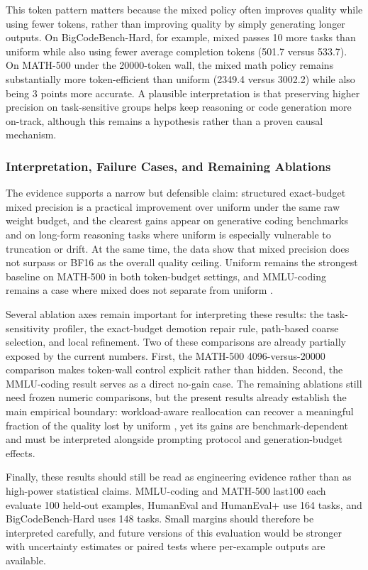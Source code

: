 This token pattern matters because the mixed policy often improves quality while using fewer tokens, rather than improving quality by simply generating longer outputs. On BigCodeBench-Hard, for example, mixed passes 10 more tasks than uniform \intfour{} while also using fewer average completion tokens (501.7 versus 533.7). On MATH-500 under the 20000-token wall, the mixed math policy remains substantially more token-efficient than uniform \intfour{} (2349.4 versus 3002.2) while also being 3 points more accurate. A plausible interpretation is that preserving higher precision on task-sensitive groups helps keep reasoning or code generation more on-track, although this remains a hypothesis rather than a proven causal mechanism.

\subsubsection{Interpretation, Failure Cases, and Remaining Ablations}

The evidence supports a narrow but defensible claim: structured exact-budget mixed precision is a practical improvement over uniform \intfour{} under the same raw weight budget, and the clearest gains appear on generative coding benchmarks and on long-form reasoning tasks where uniform \intfour{} is especially vulnerable to truncation or drift. At the same time, the data show that mixed precision does not surpass \inteight{} or BF16 as the overall quality ceiling. Uniform \inteight{} remains the strongest baseline on MATH-500 in both token-budget settings, and MMLU-coding remains a case where mixed does not separate from uniform \intfour{}.

Several ablation axes remain important for interpreting these results: the task-sensitivity profiler, the exact-budget demotion repair rule, path-based coarse selection, and local refinement. Two of these comparisons are already partially exposed by the current numbers. First, the MATH-500 4096-versus-20000 comparison makes token-wall control explicit rather than hidden. Second, the MMLU-coding result serves as a direct no-gain case. The remaining ablations still need frozen numeric comparisons, but the present results already establish the main empirical boundary: workload-aware reallocation can recover a meaningful fraction of the quality lost by uniform \intfour{}, yet its gains are benchmark-dependent and must be interpreted alongside prompting protocol and generation-budget effects.

Finally, these results should still be read as engineering evidence rather than as high-power statistical claims. MMLU-coding and MATH-500 last100 each evaluate 100 held-out examples, HumanEval and HumanEval+ use 164 tasks, and BigCodeBench-Hard uses 148 tasks. Small margins should therefore be interpreted carefully, and future versions of this evaluation would be stronger with uncertainty estimates or paired tests where per-example outputs are available.
